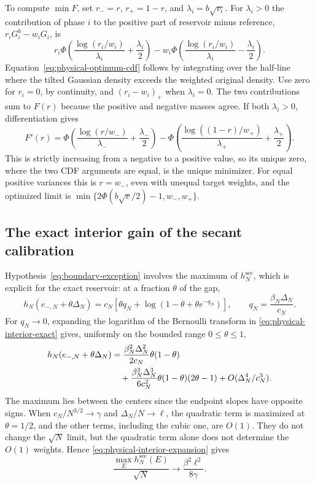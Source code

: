 To compute $\min F$, set $r_-=r$, $r_+=1-r$, and $\lambda_i=b\sqrt{v_i}$.
For $\lambda_i>0$ the contribution of phase $i$ to the positive part of
reservoir minus reference, $r_iG_i^b-w_iG_i$, is
\begin{equation}
 r_i\Phi\!\left(\frac{\log(r_i/w_i)}{\lambda_i}+\frac{\lambda_i}{2}\right)
 -w_i\Phi\!\left(\frac{\log(r_i/w_i)}{\lambda_i}-\frac{\lambda_i}{2}\right).
 \label{eq:physical-optimum-cdf}
\end{equation}
Equation~\eqref{eq:physical-optimum-cdf} follows by integrating over
the half-line where the tilted Gaussian density exceeds the weighted
original density. Use zero for $r_i=0$, by continuity, and
$(r_i-w_i)_+$ when $\lambda_i=0$. The two contributions sum to $F(r)$
because the positive and negative masses agree. If both $\lambda_i>0$,
differentiation gives
\[
 F'(r)=
 \Phi\!\left(\frac{\log(r/w_-)}{\lambda_-}+\frac{\lambda_-}{2}\right)
 -\Phi\!\left(\frac{\log((1-r)/w_+)}{\lambda_+}+\frac{\lambda_+}{2}\right).
\]
This is strictly increasing from a negative to a positive value, so
its unique zero, where the two CDF arguments are equal, is the unique
minimizer. For equal positive variances this is $r=w_-$, even with
unequal target weights, and the optimized limit is
$\min\{2\Phi(b\sqrt v/2)-1,w_-,w_+\}$.

\subsection{The exact interior gain of the secant calibration}

Hypothesis~\eqref{eq:boundary-exception} involves the maximum of
$h_N^{\mathrm{sec}}$, which is explicit for the exact reservoir: at a
fraction $\theta$ of the gap,
\begin{equation}
 h_N(e_{-,N}+\theta\Delta_N)
 =c_N\left[\theta q_N+
 \log(1-\theta+\theta e^{-q_N})\right],
 \qquad q_N=\frac{\beta_N\Delta_N}{c_N}.
 \label{eq:physical-interior-exact}
\end{equation}
For $q_N\to0$, expanding the logarithm of the Bernoulli transform in
\eqref{eq:physical-interior-exact} gives, uniformly on the bounded
range $0\le\theta\le1$,
\begin{align}
 h_N(e_{-,N}+\theta\Delta_N)
 &=\frac{\beta_N^2\Delta_N^2}{2c_N}\theta(1-\theta)
 \notag\\
 &\quad+\frac{\beta_N^3\Delta_N^3}{6c_N^2}
       \theta(1-\theta)(2\theta-1)
 +O(\Delta_N^4/c_N^3).
 \label{eq:physical-interior-expansion}
\end{align}
The maximum lies between the centers since the endpoint slopes have
opposite signs. When $c_N/N^{3/2}\to\gamma$ and $\Delta_N/N\to\ell$,
the quadratic term is maximized at $\theta=1/2$, and the other terms,
including the cubic one, are $O(1)$. They do not change the $\sqrt N$
limit, but the quadratic term alone does not determine the $O(1)$
weights. Hence \eqref{eq:physical-interior-expansion} gives
\begin{equation}
 \frac{\max_Eh_N^{\mathrm{sec}}(E)}{\sqrt N}
 \longrightarrow\frac{\beta^2\ell^2}{8\gamma}.
 \label{eq:boundary-maximal-gain}
\end{equation}

